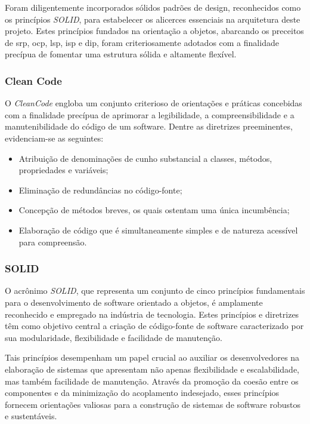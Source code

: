 Foram diligentemente incorporados sólidos padrões de design, reconhecidos como os princípios \textit{\gls{SOLID}}, para estabelecer os alicerces essenciais na arquitetura deste projeto. Estes princípios fundados na orientação a objetos, abarcando os preceitos de \ac{srp}, \ac{ocp}, \ac{lsp}, \ac{isp} e \ac{dip}, foram criteriosamente adotados com a finalidade precípua de fomentar uma estrutura sólida e altamente flexível.

\subsubsection{Clean Code}

O \textit{\gls{CleanCode}} engloba um conjunto criterioso de orientações e práticas concebidas com a finalidade precípua de aprimorar a legibilidade, a compreensibilidade e a manutenibilidade do código de um software. Dentre as diretrizes preeminentes, evidenciam-se as seguintes:

\begin{itemize}
    \item Atribuição de denominações de cunho substancial a classes, métodos, propriedades e variáveis;
    \item Eliminação de redundâncias no código-fonte;
    \item Concepção de métodos breves, os quais ostentam uma única incumbência;
    \item Elaboração de código que é simultaneamente simples e de natureza acessível para compreensão.
\end{itemize}

\subsubsection{SOLID}

O acrônimo \textit{\gls{SOLID}}, que representa um conjunto de cinco princípios fundamentais para o desenvolvimento de software orientado a objetos, é amplamente reconhecido e empregado na indústria de tecnologia. Estes princípios e diretrizes têm como objetivo central a criação de código-fonte de software caracterizado por sua modularidade, flexibilidade e facilidade de manutenção.

Tais princípios desempenham um papel crucial ao auxiliar os desenvolvedores na elaboração de sistemas que apresentam não apenas flexibilidade e escalabilidade, mas também facilidade de manutenção. Através da promoção da coesão entre os componentes e da minimização do acoplamento indesejado, esses princípios fornecem orientações valiosas para a construção de sistemas de software robustos e sustentáveis.